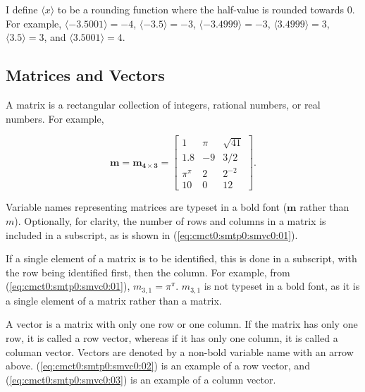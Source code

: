 I define $\langle x \rangle$ to be a rounding function where the half-value is rounded towards 0.
For example, $\langle -3.5001 \rangle = -4$,
$\langle -3.5 \rangle = -3$,
$\langle -3.4999 \rangle = -3$,
$\langle 3.4999 \rangle = 3$,
$\langle 3.5 \rangle = 3$,
and $\langle 3.5001 \rangle = 4$.


\subsection{Matrices and Vectors}
\label{cmct0:smtp0:smvc0}

A matrix is a rectangular collection of integers, rational numbers, or real
numbers.  For example,

\begin{equation}
\label{eq:cmct0:smtp0:smvc0:01}
\boldsymbol{m} = \boldsymbol{m_{4 \times 3}} = \left[ \begin{array}{ccc}
1        & \pi & \sqrt{41} \\
1.8      & -9  & 3/2       \\
\pi^\pi  &  2  & 2^{-2}    \\
10       &  0  & 12
\end{array}\right].
\end{equation}

Variable names representing matrices are typeset in a bold font
($\boldsymbol{m}$ rather than $m$).  Optionally, for clarity,
the number of rows and columns in a matrix is included in a subscript,
as is shown in (\ref{eq:cmct0:smtp0:smvc0:01}).

If a single element of a matrix is to be identified, this is done in a subscript,
with the row being identified first, then the column.
For example, from (\ref{eq:cmct0:smtp0:smvc0:01}), $m_{3,1} = \pi^\pi$.
$m_{3,1}$ is not typeset in a bold font, as it is a single element
of a matrix rather than a matrix.

A vector is a matrix with only one row or one column.  If the matrix has only one row,
it is called a row vector, whereas if it has only one column, it is called a columan vector.
Vectors are denoted by a non-bold variable name with an arrow above.
(\ref{eq:cmct0:smtp0:smvc0:02}) is an example of a row vector, and
(\ref{eq:cmct0:smtp0:smvc0:03}) is an example of a column vector.

